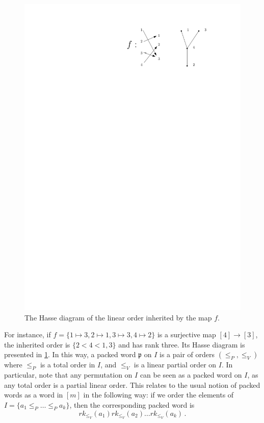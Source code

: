 \documentclass[12pt, reqno]{amsart}
\theoremstyle{definition}
\begin{document}
\begin{figure}[h]
	\centering
	\includegraphics[scale=1]{images/packedWordOrder.pdf}
	\caption{The Hasse diagram of the linear order inherited by the map $f$. \label{fig:packedWordOrder}}
\end{figure}

For instance, if $f = \{ 1\mapsto 3, 2\mapsto 1, 3\mapsto 3, 4\mapsto 2\}$ is a surjective map $[4]\to[3]$, the inherited order is $\{2 < 4 < 1, 3\}$ and has rank three.
Its Hasse diagram is presented in \cref{fig:packedWordOrder}.
In this way, a packed word $\mathfrak{p}$ on $I$ is a pair of orders $(\leq_P, \leq_V)$ where $\leq_P$ is a total order in $I$, and $\leq_V$ is a linear partial order on $I$.
In particular, note that any permutation on $I$ can be seen as a packed word on $I$, as any total order is a partial linear order.
This relates to the usual notion of packed words as a word in $[m]$ in the following way:
if we order the elements of $I = \{a_1 \leq_P \dots \leq_P a_k \}$, then the corresponding packed word is 
$$rk_{\leq_V}(a_1)rk_{\leq_V}(a_2) \dots rk_{\leq_V}(a_k) \, .$$
\end{document}
